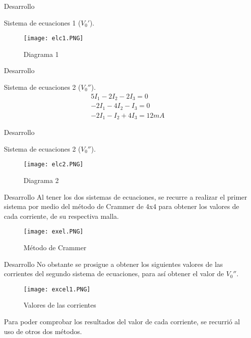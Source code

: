 \documentclass[11pt]{beamer}
\begin{document}
      
      \begin{frame}{Desarrollo}
    
       \begin{block}{Sistema de ecuaciones 1 ($V_0'$).}
\begin{figure}[hbtp]
\caption{Diagrama 1}
\centering
\texttt{[image: elc1.PNG]}
\end{figure}
\end{block}
      \end{frame}
      
      
      \begin{frame}{Desarrollo}
       \begin{block}{Sistema de ecuaciones 2 ($V_0''$).}
\begin{eqnarray}
5I_{1} - 2I_{2} - 2I_{3} = 0\\
-2I_{1} - 4I_{2} - I_{3} = 0\\
-2I_{1} - I_{2} + 4I_{3} = 12mA
\end{eqnarray}
\end{block}
      \end{frame}
      
       
      \begin{frame}{Desarrollo}
     \begin{block}{Sistema de ecuaciones 2 ($V_0''$).}
\begin{figure}[hbtp]
\caption{Diagrama 2}
\centering
\texttt{[image: elc2.PNG]}
\end{figure}
\end{block}
      \end{frame}
      
      
      \begin{frame}{Desarrollo}
     Al tener los dos sistemas de ecuaciones, se recurre a realizar el primer sistema por medio del método de Crammer de 4x4 para obtener los valores de cada corriente, de su respectiva malla.
\begin{figure}[hbtp]
\caption{Método de Crammer}
\centering
\texttt{[image: exel.PNG]}
\end{figure}
      \end{frame}
      
     
      \begin{frame}{Desarrollo}
     No obstante se prosigue a obtener los siguientes valores de las corrientes del segundo sistema de ecuaciones, para así obtener el valor de $V_0''$.
\begin{figure}[hbtp]
\caption{Valores de las corrientes}
\centering
\texttt{[image: excel1.PNG]}
\end{figure}
Para poder comprobar los resultados del valor de cada corriente, se recurrió al uso de otros dos métodos.
      \end{frame}
      
\end{document}
